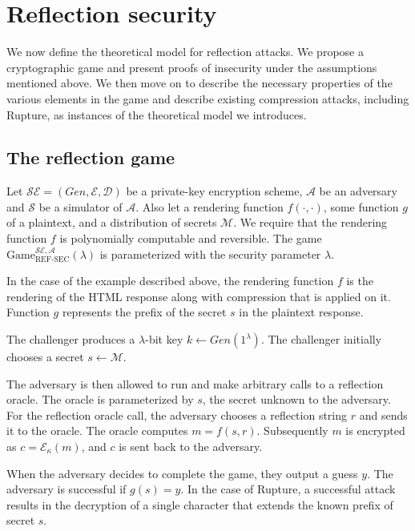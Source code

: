 \section{Reflection security}\label{sec:refsec}

We now define the theoretical model for reflection attacks. We propose a
cryptographic game and present proofs of insecurity under the assumptions
mentioned above. We then move on to describe the necessary properties of the
various elements in the game and describe existing compression attacks,
including Rupture, as instances of the theoretical model we introduces.

\subsection{The reflection game}\label{subsec:refsecgame}

Let $\mathcal{SE} = (Gen, \mathcal{E}, \mathcal{D})$ be a private-key encryption
scheme, $\mathcal{A}$ be an adversary and $\mathcal{S}$ be a simulator of
$\mathcal{A}$. Also let a rendering function $f(\cdot, \cdot)$, some function
$g$ of a plaintext, and a distribution of secrets $\mathcal{M}$. We require that
the rendering function $f$ is polynomially computable and reversible. The game
$\text{Game}_{\text{REF-SEC}}^{\mathcal{SE},\mathcal{A}}(\lambda)$ is
parameterized with the security parameter $\lambda$.

In the case of the example described above, the rendering function $f$ is the
rendering of the HTML response along with compression that is applied on it.
Function $g$ represents the prefix of the secret $s$ in the plaintext response.

The challenger produces a $\lambda$-bit key $k \leftarrow Gen(1^\lambda)$. The
challenger initially chooses a secret $s \leftarrow \mathcal{M}$.

The adversary is then allowed to run and make arbitrary calls to a reflection
oracle. The oracle is parameterized by $s$, the secret unknown to the adversary.
For the reflection oracle call, the adversary chooses a reflection string $r$
and sends it to the oracle. The oracle computes $m = f(s, r)$. Subsequently $m$
is encrypted as $c = \mathcal{E}_\kappa(m)$, and $c$ is sent back to the
adversary.

When the adversary decides to complete the game, they output a guess $y$. The
adversary is successful if $g(s) = y$. In the case of Rupture, a successful
attack results in the decryption of a single character that extends the known
prefix of secret $s$.

